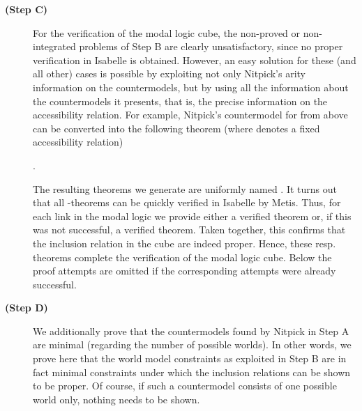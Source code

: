 \begin{isabellebody}
\begin{isamarkuptext}
\begin{description}
\item[\textbf{(Step C)}] For the verification of the modal logic cube, the non-proved or non-integrated  problems of Step B are clearly unsatisfactory, since
no proper verification in Isabelle is obtained. However, an easy solution for these (and all other) cases
is possible by exploiting not only Nitpick's arity information on the countermodels, but by using all the information about the 
countermodels it presents, that is, the precise information on the accessibility relation. 
For example, Nitpick's countermodel for  from above 
can be converted into the following theorem
(where  denotes a fixed accessibility relation) 
\begin{center}
. 
\end{center}
The resulting theorems we generate 
are uniformly named . It turns out that all  -theorems can be quickly verified in Isabelle by Metis. 
Thus, for each link in the modal logic we provide either a verified  theorem or, if this was not successful, a verified  
theorem. Taken together, this confirms that the inclusion relation in the cube are indeed proper. 
Hence, these  resp.  theorems complete the verification of the modal logic cube. Below the 
 proof attempts are omitted if the corresponding  attempts were already successful.

 
\item[\textbf{(Step D)}] We additionally prove that the countermodels found by Nitpick in Step A are minimal (regarding the number 
of possible worlds). In other words, we prove here that the world model constraints as exploited in Step B are in fact minimal constraints
under which the inclusion relations can be shown to be proper. Of course, if such a countermodel consists of one possible world only, nothing 
needs to be shown. 
\end{description}


\end{isamarkuptext}
\end{isabellebody}
